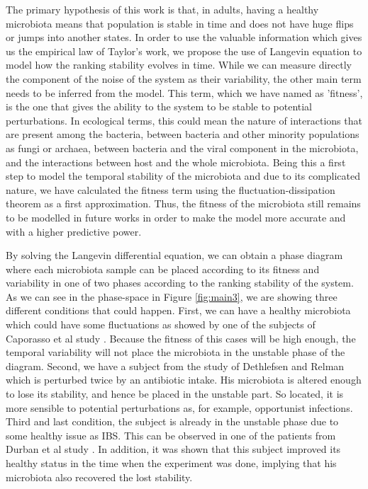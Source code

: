 The primary hypothesis of this work is that, in adults, having a healthy microbiota means that population is stable in time and does not have huge flips or jumps into another states. In order to use the valuable information which gives us the empirical law of Taylor's work, we propose the use of Langevin equation to model how the ranking stability evolves in time. While we can measure directly the component of the noise of the system as their variability, the other main term needs to be inferred from the model. This term, which we have named as 'fitness', is the one that gives the ability to the system to be stable to potential perturbations. In ecological terms, this could mean the nature of interactions that are present among the bacteria, between bacteria and other minority populations as fungi or archaea, between bacteria and the viral component in the microbiota, and the interactions between host and the whole microbiota. Being this a first step to model the temporal stability of the microbiota and due to its complicated nature, we have calculated the fitness term using the fluctuation-dissipation theorem as a first approximation. Thus, the fitness of the microbiota still remains to be modelled in future works in order to make the model more accurate and with a higher predictive power. 

By solving the Langevin differential equation, we can obtain a phase diagram where each microbiota sample can be placed according to its fitness and variability in one of two phases according to the ranking stability of the system. As we can see in the phase-space in Figure \ref{fig:main3}, we are showing three different conditions that could happen. First, we can have a healthy microbiota which could have some fluctuations as showed by one of the subjects of Caporasso et al study \cite{moving}. Because the fitness of this cases will be high enough, the temporal variability will not place the microbiota in the unstable phase of the diagram. Second, we have a subject from the study of Dethlefsen and Relman \cite{antibiotic} which is perturbed twice by an antibiotic intake. His microbiota is altered enough to lose its stability, and hence be placed in the unstable part. So located, it is more sensible to potential perturbations as, for example, opportunist infections. Third and last condition, the subject is already in the unstable phase due to some healthy issue as IBS. This can be observed in one of the patients from Durban et al study \cite{IBS}. In addition, it was shown that this subject improved its healthy status in the time when the experiment was done, implying that his microbiota also recovered the lost stability. 


